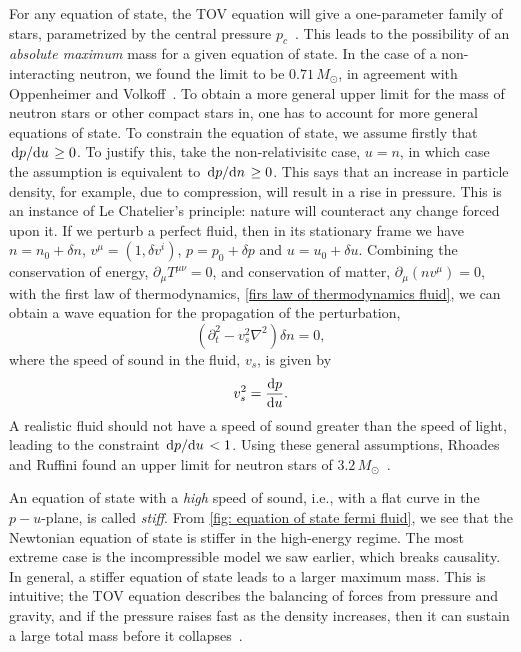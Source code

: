 For any equation of state, the TOV equation will give a one-parameter family of stars, parametrized by the central pressure $p_c$~\autocite{misnerGravitation2009}.
This leads to the possibility of an \emph{absolute maximum} mass for a given equation of state.
In the case of a non-interacting neutron, we found the limit to be $0.71 \, M_\odot$, in agreement with Oppenheimer and Volkoff~\autocite{oppenheimerMassiveNeutronCores1939}.
To obtain a more general upper limit for the mass of neutron stars or other compact stars in, one has to account for more general equations of state.
To constrain the equation of state, we assume firstly that $\odv{p}/{u} \geq 0$.
To justify this, take the non-relativisitc case, $u = n$, in which case the assumption is equivalent to $\odv{p}/{n} \geq 0$.
This says that an increase in particle density, for example, due to compression, will result in a rise in pressure.
This is an instance of Le Chatelier's principle: nature will counteract any change forced upon it.
If we perturb a perfect fluid, then in its stationary frame we have $n = n_0 + \delta n$, $v^\mu = (1, \delta v^i)$, $p = p_0 + \delta p$ and $u = u_0 + \delta u$.
Combining the conservation of energy, $\partial_\mu T^{\mu \nu} = 0$, and conservation of matter, $\partial_\mu (n v^\mu) = 0$, with the first law of thermodynamics, \autoref{firs law of thermodynamics fluid}, we can obtain a wave equation for the propagation of the perturbation,
%
\begin{equation}
    (\partial_t^2 - v_s^2 \nabla^2) \delta n = 0,
\end{equation}
%
where the speed of sound in the fluid, $v_s$, is given by~\autocite{weinbergGravitationCosmologyPrinciples1972}
%
\begin{equation}
    v_s^2 = \odv{p}{u}.
\end{equation}
%
A realistic fluid should not have a speed of sound greater than the speed of light, leading to the constraint $\odv{p}/{u} < 1$.
Using these general assumptions, Rhoades and Ruffini found an upper limit for neutron stars of $3.2 \, M_\odot$~\cite{rhoadesMaximumMassNeutron1974}.

An equation of state with a \emph{high} speed of sound, i.e., with a flat curve in the $p-u$-plane, is called \emph{stiff}.
From \autoref{fig: equation of state fermi fluid}, we see that the Newtonian equation of state is stiffer in the high-energy regime.
The most extreme case is the incompressible model we saw earlier, which breaks causality.
In general, a stiffer equation of state leads to a larger maximum mass.
This is intuitive; the TOV equation describes the balancing of forces from pressure and gravity, and if the pressure raises fast as the density increases, then it can sustain a large total mass before it collapses~\autocite{glendenningCompactStarsNuclear2012}.


